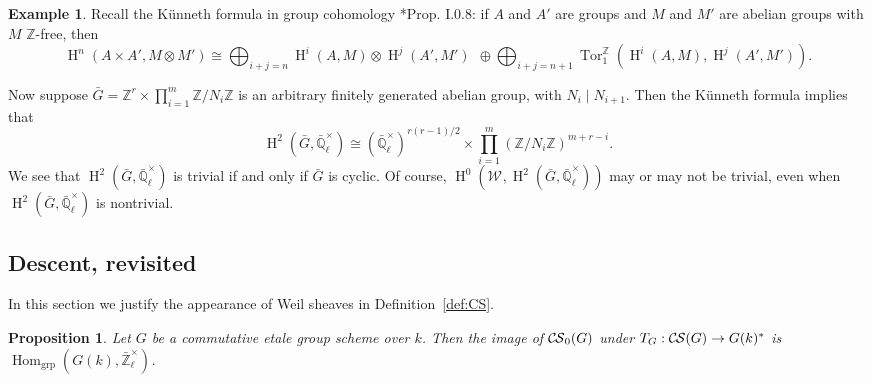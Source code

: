 \documentclass[10pt]{amsart}
\theoremstyle{plain}
\newtheorem{proposition}[theorem]{Proposition}
\theoremstyle{definition}
\newtheorem{example}[theorem]{Example}
\newcommand{\ZZ}{{\mathbb{Z}}}
\newcommand{\EE}{\mathbb{\bar Q}_\ell}
\newcommand{\Fq}{k}
\newcommand{\EEx}{\EE^\times}
\newcommand{\ZEx}{\mathbb{\bar Z}_\ell^\times}
\newcommand{\Weil}[1]{\mathcal{W}_{#1}}
\DeclareMathOperator{\Hom}{Hom}
\DeclareMathOperator{\Hh}{H}
\DeclareMathOperator{\Tor}{Tor}
\newcommand{\TrFrob}[1]{T_{#1}}
\newcommand{\CS}{{\mathcal{C\hskip-0.8pt S}}}
\newcommand{\bCS}{{\CS_0}}
\newcommand{\bG}{\bar{G}}
\begin{document}
\begin{example} \label{eg:H2}
Recall the K\"unneth formula in group cohomology \cite{brown:CohomologyOfGroups}*{Prop. I.0.8}: if $A$ and $A'$ are groups and $M$ and $M'$ are abelian groups with $M$ $\ZZ$-free, then
\[
\Hh^n(A \times A', M \otimes M') \cong \bigoplus_{i+j=n} \Hh^i(A, M) \otimes \Hh^j(A', M') \ \ \oplus \bigoplus_{i+j=n+1} \Tor_1^{\ZZ}\left(\Hh^i(A, M), \Hh^j(A', M')\right).
\]

Now suppose $\bG = \ZZ^r \times \prod_{i = 1}^m \ZZ/N_i\ZZ$ is an arbitrary finitely generated abelian group, with $N_i \mid N_{i+1}$.  Then the K\"unneth formula implies that
\[
\Hh^2(\bG, \EEx) \cong \left(\EEx\right)^{r(r-1)/2} \times \prod_{i=1}^m (\ZZ/N_i\ZZ)^{m+r-i}.
\]
We see that $\Hh^2(\bG, \EEx)$ is trivial if and only if $\bG$ is cyclic.  Of course, $\Hh^0(\Weil{}, \Hh^2(\bG, \EEx))$ may or may not be trivial, even when $\Hh^2(\bG, \EEx)$ is nontrivial.
\end{example}

\subsection{Descent, revisited}\label{ssec:bS}

In this section we justify the appearance of Weil sheaves in Definition~\ref{def:CS}.

\begin{proposition}\label{prop:bounded-etale}
Let $G$ be a commutative etale group scheme over $\Fq$.
Then the image of $\bCS(G)$ under $\TrFrob{G} : \CS(G) \to G(\Fq)^*$ is $\Hom_\text{grp}(G(\Fq),\ZEx)$.
\end{proposition}
\end{document}

